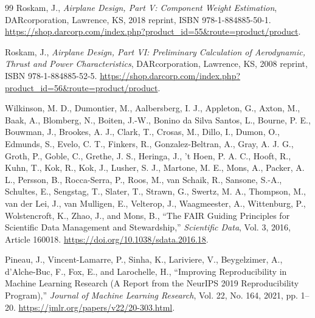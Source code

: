 \begin{thebibliography}{99}
 Roskam, J., \emph{Airplane Design, Part V: Component Weight Estimation}, DARcorporation, Lawrence, KS, 2018 reprint, ISBN 978-1-884885-50-1. \url{https://shop.darcorp.com/index.php?product_id=55&route=product/product}.

 Roskam, J., \emph{Airplane Design, Part VI: Preliminary Calculation of Aerodynamic, Thrust and Power Characteristics}, DARcorporation, Lawrence, KS, 2008 reprint, ISBN 978-1-884885-52-5. \url{https://shop.darcorp.com/index.php?product_id=56&route=product/product}.

 Wilkinson, M. D., Dumontier, M., Aalbersberg, I. J., Appleton, G., Axton, M., Baak, A., Blomberg, N., Boiten, J.-W., Bonino da Silva Santos, L., Bourne, P. E., Bouwman, J., Brookes, A. J., Clark, T., Crosas, M., Dillo, I., Dumon, O., Edmunds, S., Evelo, C. T., Finkers, R., Gonzalez-Beltran, A., Gray, A. J. G., Groth, P., Goble, C., Grethe, J. S., Heringa, J., 't Hoen, P. A. C., Hooft, R., Kuhn, T., Kok, R., Kok, J., Lusher, S. J., Martone, M. E., Mons, A., Packer, A. L., Persson, B., Rocca-Serra, P., Roos, M., van Schaik, R., Sansone, S.-A., Schultes, E., Sengstag, T., Slater, T., Strawn, G., Swertz, M. A., Thompson, M., van der Lei, J., van Mulligen, E., Velterop, J., Waagmeester, A., Wittenburg, P., Wolstencroft, K., Zhao, J., and Mons, B., ``The FAIR Guiding Principles for Scientific Data Management and Stewardship,'' \emph{Scientific Data}, Vol. 3, 2016, Article 160018. \url{https://doi.org/10.1038/sdata.2016.18}.

 Pineau, J., Vincent-Lamarre, P., Sinha, K., Lariviere, V., Beygelzimer, A., d'Alche-Buc, F., Fox, E., and Larochelle, H., ``Improving Reproducibility in Machine Learning Research (A Report from the NeurIPS 2019 Reproducibility Program),'' \emph{Journal of Machine Learning Research}, Vol. 22, No. 164, 2021, pp. 1--20. \url{https://jmlr.org/papers/v22/20-303.html}.
\end{thebibliography}
